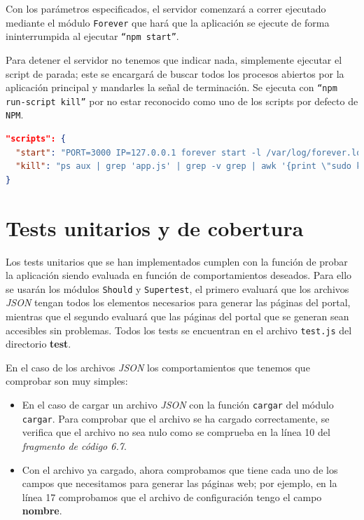 Con los parámetros especificados, el servidor comenzará a correr ejecutado mediante el módulo {\tt Forever} que hará que la aplicación se ejecute de forma ininterrumpida al ejecutar {\tt ``npm start''}.

\bigskip
Para detener el servidor no tenemos que indicar nada, simplemente ejecutar el script de parada; este se encargará de buscar todos los procesos abiertos por la aplicación principal y mandarles la señal de terminación. Se ejecuta con {\tt ``npm run-script kill''} por no estar reconocido como uno de los scripts por defecto de {\tt NPM}.

\begin{lstlisting}[language=json,caption={Scripts de inicio y detención},label={lst:ini_para}]
"scripts": {
  "start": "PORT=3000 IP=127.0.0.1 forever start -l /var/log/forever.log -a -o /var/log/out.log -e /var/log/err.log ./app.js",
  "kill": "ps aux | grep 'app.js' | grep -v grep | awk '{print \"sudo kill -9 \" $2}' | sh"
}
\end{lstlisting}

\section{Tests unitarios y de cobertura}

Los tests unitarios que se han implementados cumplen con la función de probar la aplicación siendo evaluada en función de comportamientos deseados. Para ello se usarán los módulos {\tt Should} y {\tt Supertest}, el primero evaluará que los archivos \textit{JSON} tengan todos los elementos necesarios para generar las páginas del portal, mientras que el segundo evaluará que las páginas del portal que se generan sean accesibles sin problemas. Todos los tests se encuentran en el archivo {\tt test.js} del directorio \textbf{test}.

\bigskip
En el caso de los archivos \textit{JSON} los comportamientos que tenemos que comprobar son muy simples:

\begin{itemize}
	\item En el caso de cargar un archivo \textit{JSON} con la función {\tt cargar} del módulo {\tt cargar}. Para comprobar que el archivo se ha cargado correctamente, se verifica que el archivo no sea nulo como se comprueba en la línea 10 del \textit{fragmento de código 6.7}.
	\item Con el archivo ya cargado, ahora comprobamos que tiene cada uno de los campos que necesitamos para generar las páginas web; por ejemplo, en la línea 17 comprobamos que el archivo de configuración tengo el campo \textbf{nombre}.
\end{itemize}


